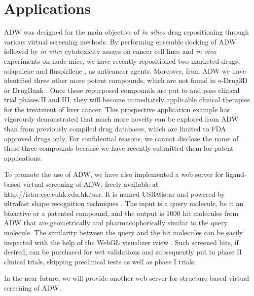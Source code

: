 \documentclass{bioinfo}
\begin{document}
\section{Applications}

ADW was designed for the main objective of \textit{in silico} drug repositioning through various virtual screening methods. By performing ensemble docking of ADW followed by \textit{in vitro} cytotoxicity assays on cancer cell lines and \textit{in vivo} experiments on nude mice, we have recently repositioned two marketed drugs, adapalene \citep{1681} and fluspirilene \citep{1667}, as anticancer agents. Moreover, from ADW we have identified three other more potent compounds, which are not found in e-Drug3D \citep{1125} or DrugBank \citep{1594}. Once these repurposed compounds are put to and pass clinical trial phases II and III, they will become immediately applicable clinical therapies for the treatment of liver cancer. This prospective application example has vigorously demonstrated that much more novelty can be explored from ADW than from previously compiled drug databases, which are limited to FDA approved drugs only. For confidential reasons, we cannot disclose the name of these three compounds because we have recently submitted them for patent applications.

To promote the use of ADW, we have also implemented a web server for ligand-based virtual screening of ADW, freely available at http://istar.cse.cuhk.edu.hk/usr. It is named USR@istar and powered by ultrafast shape recognition techniques \citep{1379,1331}. The input is a query molecule, be it an bioactive or a patented compound, and the output is 1000 hit molecules from ADW that are geometrically and pharmacophorically similar to the query molecule. The similarity between the query and the hit molecules can be easily inspected with the help of the WebGL visualizer iview \citep{1366}. Such screened hits, if desired, can be purchased for wet validations and subsequently put to phase II clinical trials, skipping preclinical tests as well as phase I trials.



In the near future, we will provide another web server for structure-based virtual screening of ADW.
\end{document}
